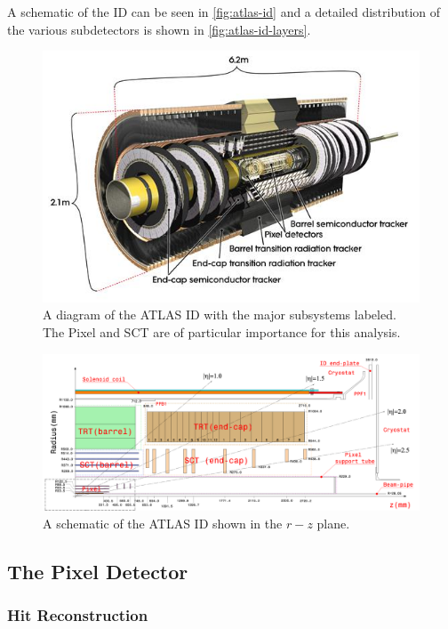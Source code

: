 A schematic of the \ac{ID} can be seen in \autoref{fig:atlas-id} and a detailed distribution of the various subdetectors is shown in \autoref{fig:atlas-id-layers}. 


\begin{figure}[htbp]
\centering
\includegraphics[width=.8\textwidth]{figures/Detector/atlas-ID.jpg}
\caption{A diagram of the \ac{ATLAS} \ac{ID} with the major subsystems labeled. The Pixel and \ac{SCT} are of particular importance for this analysis.}
\end{figure}

\begin{figure}[htbp]
\centering
\includegraphics[width=.8\textwidth]{figures/Detector/atlas-id-layers.png}
\caption{A schematic of the \ac{ATLAS} \ac{ID} shown in the $r-z$ plane. }
\label{fig:atlas-id-layers}
\end{figure}

\subsection{The Pixel Detector}
\subsubsection{Hit Reconstruction}
